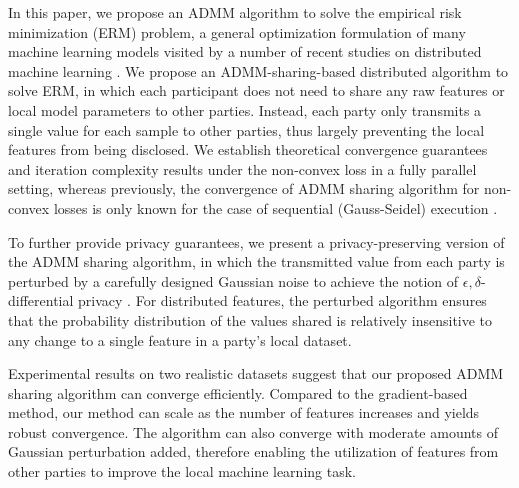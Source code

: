In this paper, we propose an ADMM algorithm to solve the empirical risk minimization (ERM) problem, a general optimization formulation of many machine learning models visited by a number of recent studies on distributed machine learning  \cite{ying2018supervised,chaudhuri2011differentially}. We propose an ADMM-sharing-based distributed algorithm to solve ERM, in which each participant does not need to share any raw features or local model parameters to other parties. Instead, each party only transmits a single value for each sample to other parties, thus largely preventing the local features from being disclosed. We establish theoretical convergence guarantees and iteration complexity results under the non-convex loss in a fully parallel setting, whereas previously, the convergence of ADMM sharing algorithm for non-convex losses is only known for the case of sequential (Gauss-Seidel) execution \cite{hong2016convergence}.

To further provide privacy guarantees, we present a privacy-preserving version of the ADMM sharing algorithm, in which the transmitted value from each party is perturbed by a carefully designed Gaussian noise to achieve
the notion of $\epsilon,\delta$-differential privacy \cite{dwork2008differential,dwork2014algorithmic}. For distributed features, the perturbed algorithm ensures that the probability distribution of the values shared is relatively insensitive to any change to a single feature in a party's local dataset.

Experimental results on two realistic datasets suggest that our proposed ADMM sharing algorithm can converge efficiently. Compared to the gradient-based method, our method can scale as the number of features increases and yields robust convergence. The algorithm can also converge with moderate amounts of Gaussian perturbation added, therefore enabling the utilization of features from other parties to improve the local machine learning task.
